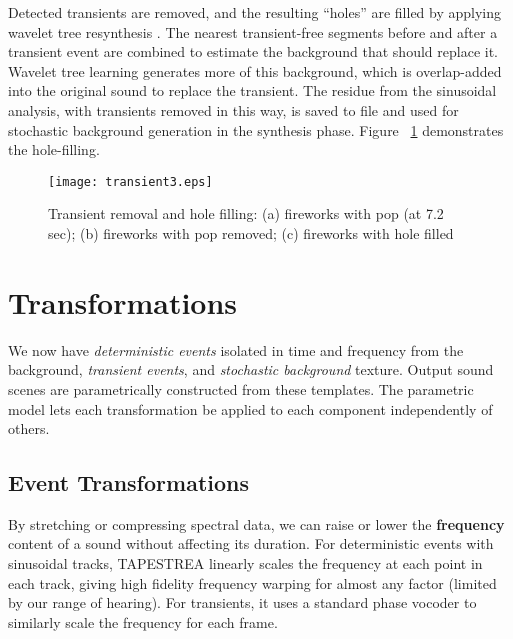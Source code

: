 \documentclass[a4paper]{article}
\begin{document}
Detected transients are removed, and the resulting ``holes'' are filled by applying 
wavelet tree resynthesis \cite{Dubnov02}. 
The nearest transient-free segments before and after a transient event are 
combined to estimate the background that should replace it. Wavelet tree 
learning generates more of this background, which is overlap-added into the original 
sound to replace the transient. The residue from the sinusoidal analysis, with transients 
removed in this way, is saved to file and used for stochastic background generation in the 
synthesis phase. Figure ~\ref{fig:transient} demonstrates the hole-filling. 
\begin{figure}[t]
\setlength\textfloatsep{0pt}
\setlength\abovecaptionskip{0pt}
\setlength\belowcaptionskip{0pt}
\centering
   \texttt{[image: transient3.eps]}
\caption{Transient removal and hole filling: (a) fireworks with pop (at 7.2 sec); (b) 
fireworks with pop removed; (c) fireworks with hole filled}
\label{fig:transient}
\end{figure}
\section{Transformations}

We now have \emph{deterministic events} isolated in time and frequency from 
the background, \emph{transient events}, and \emph{stochastic background} texture. 
Output sound scenes are parametrically constructed from these templates. The parametric model lets 
each transformation be applied to each component independently of others.

\subsection{Event Transformations}

By stretching or compressing spectral
data, we can raise or lower the \textbf{frequency} content of a sound without 
affecting its duration.  For deterministic events with sinusoidal tracks, 
TAPESTREA linearly scales the frequency at each point in each track, 
giving high fidelity frequency warping for almost any factor (limited by our 
range of hearing). For transients, it uses a standard phase vocoder \cite{Dolson86} to 
similarly scale the frequency for each frame.  
\end{document}
